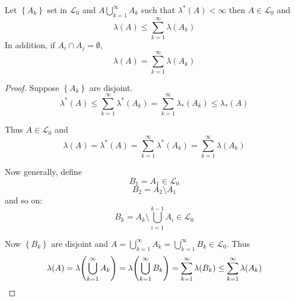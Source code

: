 \begin{theorem}
	Let $\left\{ A_k \right\}$ set in $\mathcal{L}_0$ and $A \bigcup_{k=1}^\infty A_k$ such that $\lambda^*(A) < \infty$ then $A\in \mathcal{L}_0$ and 
	$$\lambda(A) \leq \sum_{k=1}^\infty \lambda(A_k)$$
		In addition, if $A_i\cap A_j = \emptyset$,
		$$\lambda(A) = \sum_{k=1}^\infty \lambda(A_k)$$
	\begin{proof}
		Suppose $\left\{ A_k \right\}$ are disjoint.
		$$\lambda^*(A) \leq \sum_{k=1}^\infty \lambda^*(A_k) = \sum_{k=1}^\infty \lambda_*(A_k) \leq \lambda_*(A)$$
		
		Thus $A\in \mathcal{L}_0$ and
		$$\lambda(A) = \lambda^*(A) =  \sum_{k=1}^\infty \lambda^*(A_k) =  \sum_{k=1}^\infty \lambda(A_k)$$
		
		Now generally, define $$B_1 = A_1 \in \mathcal{L}_0$$
		$$B_2 = A_2 \setminus A_1$$
		and so on:
		$$B_k = A_k \setminus \bigcup_{i=1}^{k-1} A_i \in \mathcal{L}_0 $$
		
		Now $\left\{ B_k \right\} $ are disjoint and $A = \bigcup_{k=1}^\infty A_k = \bigcup_{k=1}^\infty B_k \in \mathcal{L}_0 $. Thus
		$$\lambda(A) = \lambda\qty(\bigcup_{k=1}^\infty A_k)=\lambda\qty(\bigcup_{k=1}^\infty B_k) = \sum_{k=1}^\infty \lambda(B_k) \leq \sum_{k=1}^\infty \lambda(A_k)  $$
	\end{proof}
\end{theorem}
